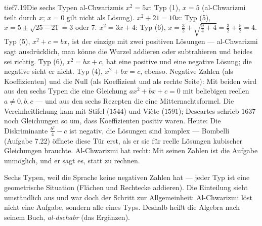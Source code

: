 \begin{loesungkarte}{tief}{7.19}{Die sechs Typen al-Chwarizmis}
$x^{2} = 5x$: Typ (1), $x = 5$ (al-Chwarizmi teilt durch $x$; $x = 0$ gilt nicht als Lösung). $x^{2} + 21 = 10x$: Typ (5), $x = 5\pm\sqrt{25 - 21} = 3$ oder $7$. $x^{2} = 3x + 4$: Typ (6), $x = \frac32 + \sqrt{\frac94 + 4} = \frac32 + \frac52 = 4$.
Typ (5), $x^{2} + c = bx$, ist der einzige mit zwei positiven Lösungen --- al-Chwarizmi sagt ausdrücklich, man könne die Wurzel addieren oder subtrahieren und beides sei richtig. Typ (6), $x^{2} = bx + c$, hat eine positive und eine negative Lösung; die negative sieht er nicht. Typ (4), $x^{2} + bx = c$, ebenso.
Negative Zahlen (als Koeffizienten) und die Null (als Koeffizient und als rechte Seite): Mit beiden wird aus den sechs Typen die eine Gleichung $ax^{2} + bx + c = 0$ mit beliebigen reellen $a\neq0, b, c$ --- und aus den sechs Rezepten die eine Mitternachtsformel. Die Vereinheitlichung kam mit Stifel ($1544$) und Viète ($1591$); Descartes schrieb $1637$ noch Gleichungen so um, dass Koeffizienten positiv waren.
Heute: Die Diskriminante $\frac{b^{2}}4 - c$ ist negativ, die Lösungen sind komplex --- Bombelli (Aufgabe 7.22) öffnete diese Tür erst, als er sie für reelle Lösungen kubischer Gleichungen brauchte. Al-Chwarizmi hat recht: Mit seinen Zahlen ist die Aufgabe unmöglich, und er sagt es, statt zu rechnen.
\begin{mitnehmen}\kastentext
Sechs Typen, weil die Sprache keine negativen Zahlen hat --- jeder Typ ist eine geometrische Situation (Flächen und Rechtecke addieren). Die Einteilung sieht umständlich aus und war doch der Schritt zur Allgemeinheit: Al-Chwarizmi löst nicht eine Aufgabe, sondern alle eines Typs. Deshalb heißt die Algebra nach seinem Buch, \emph{al-dschabr} (das Ergänzen).
\end{mitnehmen}
\end{loesungkarte}

